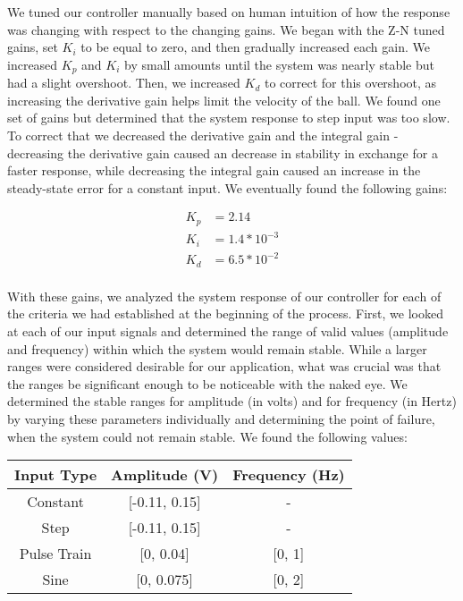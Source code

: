 \documentclass{article}
\begin{document}
We tuned our controller manually based on human intuition of how the response was changing with respect to the changing gains.  We began with the Z-N tuned gains, set $K_i$ to be equal to zero, and then gradually increased each gain.  We increased $K_p$ and $K_i$ by small amounts until the system was nearly stable but had a slight overshoot.  Then, we increased $K_d$ to correct for this overshoot, as increasing the derivative gain helps limit the velocity of the ball.  We found one set of gains but determined that the system response to step input was too slow. To correct that we decreased the derivative gain and the integral gain - decreasing the derivative gain caused an decrease in stability in exchange for a faster response, while decreasing the integral gain caused an increase in the steady-state error for a constant input.  We eventually found the following gains:
\begin{center}
\begin{align*}
K_p &= 2.14\\
K_i &= 1.4*10^{-3}\\
K_d &= 6.5*10^{-2}\\
\end{align*}
\end{center}

With these gains, we analyzed the system response of our controller for each of the criteria we had established at the beginning of the process.  First, we looked at each of our input signals and determined the range of valid values (amplitude and frequency) within which the system would remain stable.  While a larger ranges were considered desirable for our application, what was crucial was that the ranges be significant enough to be noticeable with the naked eye.  We determined the stable ranges for amplitude (in volts) and for frequency (in Hertz) by varying these parameters individually and determining the point of failure, when the system could not remain stable.  We found the following values:

\begin{center}
\begin{tabular}{|c|c|c|} \hline
Input Type & Amplitude (V) & Frequency (Hz) \\ \hline
Constant & [-0.11, 0.15] & -\\
Step & [-0.11, 0.15] & -\\
Pulse Train & [0, 0.04] & [0, 1]\\
Sine & [0, 0.075] & [0, 2]\\ \hline
\end{tabular}
\end{center}
\end{document}
